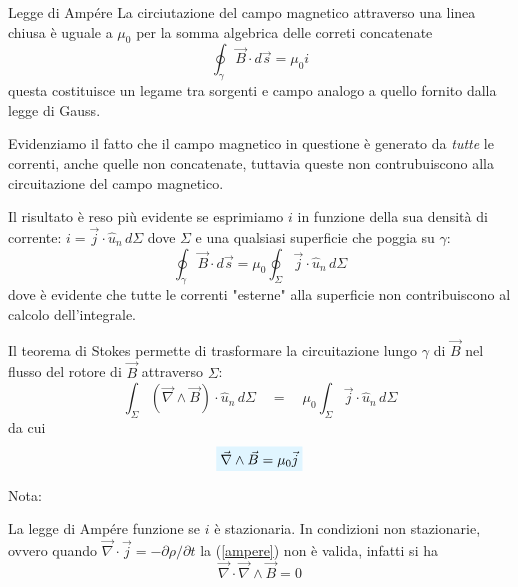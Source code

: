 \documentclass[x11names]{report}
\newcommand{\teorema}[2]{
	\begin{center}
		\fboxsep11pt
		\colorbox{myred}{\begin{minipage}{5.75in}
				\begin{redes}{#1}
					#2
				\end{redes}
		\end{minipage}}
	\end{center}
}
\newcommand{\nota}[2]{
	\begin{attenzione}{Nota:}
		#2
	\end{attenzione}
}
\newcommand{\viola}[1]{%
	\colorbox{myblue}{$\displaystyle #1$}
}
\begin{document}
\teorema{Legge di Ampére}{\label{legge ampere}
La circiutazione del campo magnetico attraverso una linea chiusa è uguale a \(\mu_0\) per la somma algebrica delle correti concatenate
\begin{equation}
	\oint_\gamma \vec{B}\cdot d\vec{s} = \mu_0 i
\end{equation}
questa costituisce un legame tra sorgenti e campo analogo a quello fornito dalla legge di Gauss.
}
Evidenziamo il fatto che il campo magnetico in questione è generato da \textit{tutte} le correnti, anche quelle non concatenate, tuttavia queste non contrubuiscono alla circuitazione del campo magnetico.

Il risultato è reso più evidente se esprimiamo \(i\) in funzione della sua densità di corrente: \(i = \vec{j}\cdot \hat{u}_n \, d\Sigma\) dove \(\Sigma\) e una qualsiasi superficie che poggia su \(\gamma\):
\[
\oint _\gamma \vec{B}\cdot d\vec{s} = \mu_0 \oint_\Sigma \vec{j}\cdot \hat{u}_n \, d\Sigma
\]
dove è evidente che tutte le correnti "esterne" alla superficie non contribuiscono al calcolo dell'integrale.

Il teorema di Stokes permette di trasformare la circuitazione lungo \(\gamma\) di \(\vec{B}\) nel flusso del rotore di \(\vec{B}\) attraverso \(\Sigma\):
\[
\int_\Sigma (\vec{\nabla}\wedge\vec{B})\cdot \hat{u}_n \, d\Sigma \quad = \quad \mu_0 \int_\Sigma \vec{j}\cdot \hat{u}_n \, d\Sigma
\]
da cui
\begin{equation}\label{ampere}
	\viola{\vec{\nabla}\wedge\vec{B} = \mu_0 \vec{j}}
\end{equation}
\nota{}{
La legge di Ampére funzione se \(i\) è stazionaria. In condizioni non stazionarie, ovvero quando \(\vec{\nabla}\cdot\vec{j} = -\partial \rho/\partial t\) la (\ref{ampere}) non è valida, infatti si ha
\[
\vec{\nabla} \cdot \vec{\nabla}\wedge\vec{B} = 0
\]
}
\end{document}
